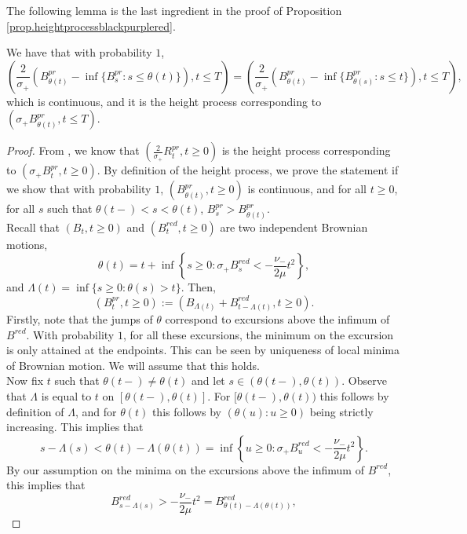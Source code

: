 The following lemma is the last ingredient in the proof of Proposition \ref{prop.heightprocessblackpurplered}.
\begin{lemma}\label{lemma.heightprocesstimechange}
We have that with probability $1$, $$\left(\frac{2}{\sigma_+} \left(B^{pr}_{\theta (t)}-\inf\{B^{pr}_{s}:s\leq \theta(t)\}\right), t\leq T \right)=\left(\frac{2}{\sigma_+} \left(B^{pr}_{\theta (t)}-\inf\{B^{pr}_{\theta(s)}:s\leq t\}\right), t\leq T \right),$$ which is continuous, and it is the height process corresponding to $\left(\sigma_+ B^{pr}_{\theta (t)},t\leq T\right)$. 
\end{lemma}
\begin{proof}
From \cite{legallRandomTreesApplications2005}, we know that $\left(\frac{2}{\sigma_+}R^{pr}_t,t\geq 0\right)$ is the height process corresponding to $\left(\sigma_+ B^{pr}_{t},t\geq 0\right)$. By definition of the height process, we prove the statement if we show that with probability $1$, $(B^{pr}_{\theta(t)},t\geq 0)$ is continuous, and for all $t\geq 0$, for all $s$ such that $\theta(t-)<s<\theta(t)$, $ B^{pr}_s > B^{pr}_{\theta(t)}$. \\
Recall that $(B_t, t \geq 0)$ and $(B^{red}_t, t\geq 0)$ are two independent Brownian motions, $$\theta(t)=t+\inf\left\{s\geq 0 : \sigma_+ B^{red}_s< -\frac{\nu_-}{2\mu} t^2\right\},$$ and $\Lambda(t)=\inf\{s\geq 0:\theta(s)> t\}$. Then, \begin{equation*}\left(B^{pr}_t,t \geq 0\right):=\left( B_{\Lambda(t)}+ B^{red}_{t-\Lambda(t)}, t\geq 0\right).\end{equation*}
Firstly, note that the jumps of $\theta$ correspond to excursions above the infimum of $B^{red}$.  With probability $1$, for all these excursions, the minimum on the excursion is only attained at the endpoints. This can be seen by uniqueness of local minima of Brownian motion. We will assume that this holds.\\
Now fix $t$ such that $\theta(t-)\neq \theta(t)$ and let $s\in (\theta(t-),\theta(t))$. Observe that $\Lambda$ is equal to $t$ on $[\theta(t-),\theta(t)]$. For $[\theta(t-),\theta(t))$ this follows by definition of $\Lambda$, and for $\theta(t)$ this follows by $(\theta(u):u\geq 0)$ being strictly increasing. This implies that $$s-\Lambda(s)<\theta(t)-\Lambda(\theta(t))=\inf\left\{ u\geq 0: \sigma_+ B_u^{red}<-\frac{\nu_-}{2\mu} t^2\right\}.$$ By our assumption on the minima on the excursions above the infimum of $B^{red}$, this implies that $$B^{red}_{s-\Lambda(s)}>-\frac{\nu_-}{2\mu} t^2=B^{red}_{\theta(t)-\Lambda(\theta(t))},$$

\end{proof}
